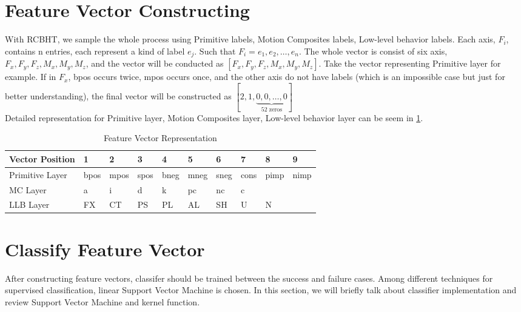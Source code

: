 \section{Feature Vector Constructing}
\indent With RCBHT, we sample the whole process using Primitive labels, Motion Composites labels, Low-level behavior labels. Each axis, $F_{i}$, contains n entries, each represent a kind of label $e_{j}$. Such that $F_{i} = {e_{1}, e_{2}, \dots , e_{n}}$. The whole vector is consist of six axis, $F_{x}, F_{y}, F_{z}, M_{x}, M_{y}, M_{z}$, and the vector will be conducted as $[F_{x}, F_{y}, F_{z}, M_{x}, M_{y}, M_{z}]$. Take the vector representing Primitive layer for example. If in $F_{x}$, bpos occurs twice, mpos occurs once, and the other axis do not have labels (which is an impossible case but just for better understanding), the final vector will be constructed as $[2, 1,\underbrace{0,0, \dots, 0}_\text{52 zeros}]$     \\
\indent Detailed representation for Primitive layer, Motion Composites layer, Low-level behavior layer can be seem in \ref{featureVector}.
\begin {table}[h]
\centering
\caption {Feature Vector Representation}
\label {featureVector}
\begin {tabular}{|llllllllll|}
\hline
Vector Position & 1     & 2     & 3     & 4     & 5     & 6     & 7     & 8     & 9     \\ \hline
Primitive Layer & bpos  & mpos  & spos  & bneg  & mneg  & sneg  & cons  & pimp  & nimp  \\ \hline
MC Layer        & a     & i     & d     & k     & pc    & nc    & c     &       &       \\ \hline
LLB Layer       & FX    & CT    & PS    & PL    & AL    & SH    & U     & N     &       \\ \hline
\end {tabular}
\end {table}
\section{Classify Feature Vector}
After constructing feature vectors, classifer should be trained between the success and failure cases. Among different techniques for supervised classification, linear Support Vector Machine is chosen. In this section, we will briefly talk about classifier implementation and review Support Vector Machine and kernel function.\\
